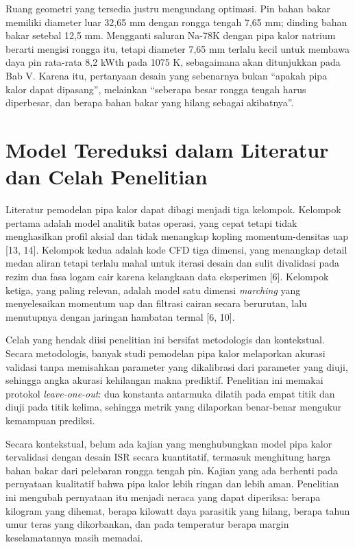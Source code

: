 \documentclass[
  indonesian,
  12pt,
  a4paper,
]{report}
\begin{document}
Ruang geometri yang tersedia justru mengundang optimasi. Pin bahan bakar
memiliki diameter luar 32,65 mm dengan rongga tengah 7,65 mm; dinding
bahan bakar setebal 12,5 mm. Mengganti saluran Na-78K dengan pipa kalor
natrium berarti mengisi rongga itu, tetapi diameter 7,65 mm terlalu
kecil untuk membawa daya pin rata-rata 8,2 kWth pada 1075 K, sebagaimana
akan ditunjukkan pada Bab V. Karena itu, pertanyaan desain yang
sebenarnya bukan ``apakah pipa kalor dapat dipasang'', melainkan
``seberapa besar rongga tengah harus diperbesar, dan berapa bahan bakar
yang hilang sebagai akibatnya''.

\section{Model Tereduksi dalam Literatur dan Celah
Penelitian}\label{model-tereduksi-dalam-literatur-dan-celah-penelitian}

Literatur pemodelan pipa kalor dapat dibagi menjadi tiga kelompok.
Kelompok pertama adalah model analitik batas operasi, yang cepat tetapi
tidak menghasilkan profil aksial dan tidak menangkap kopling
momentum-densitas uap {[}13, 14{]}. Kelompok kedua adalah kode CFD tiga
dimensi, yang menangkap detail medan aliran tetapi terlalu mahal untuk
iterasi desain dan sulit divalidasi pada rezim dua fasa logam cair
karena kelangkaan data eksperimen {[}6{]}. Kelompok ketiga, yang paling
relevan, adalah model satu dimensi \emph{marching} yang menyelesaikan
momentum uap dan filtrasi cairan secara berurutan, lalu menutupnya
dengan jaringan hambatan termal {[}6, 10{]}.

Celah yang hendak diisi penelitian ini bersifat metodologis dan
kontekstual. Secara metodologis, banyak studi pemodelan pipa kalor
melaporkan akurasi validasi tanpa memisahkan parameter yang dikalibrasi
dari parameter yang diuji, sehingga angka akurasi kehilangan makna
prediktif. Penelitian ini memakai protokol \emph{leave-one-out}: dua
konstanta antarmuka dilatih pada empat titik dan diuji pada titik
kelima, sehingga metrik yang dilaporkan benar-benar mengukur kemampuan
prediksi.

Secara kontekstual, belum ada kajian yang menghubungkan model pipa kalor
tervalidasi dengan desain ISR secara kuantitatif, termasuk menghitung
harga bahan bakar dari pelebaran rongga tengah pin. Kajian yang ada
berhenti pada pernyataan kualitatif bahwa pipa kalor lebih ringan dan
lebih aman. Penelitian ini mengubah pernyataan itu menjadi neraca yang
dapat diperiksa: berapa kilogram yang dihemat, berapa kilowatt daya
parasitik yang hilang, berapa tahun umur teras yang dikorbankan, dan
pada temperatur berapa margin keselamatannya masih memadai.
\end{document}
